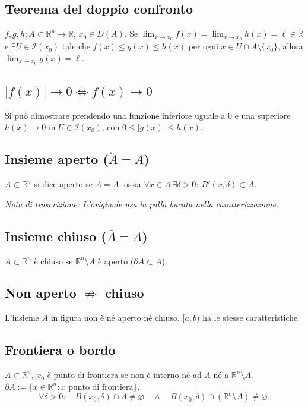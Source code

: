 \documentclass[11pt,a4paper]{article}
\newcommand{\R}{\mathbb R}\newcommand{\N}{\mathbb N}\newcommand{\pagina}[1]{\clearpage}
\newcommand{\nota}[1]{\par\textit{Nota di trascrizione: #1}\par}
\begin{document}
\subsection*{Teorema del doppio confronto}
$f,g,h:A\subset\R^n\to\R$, $x_0\in D(A)$. Se $\lim_{x\to x_0}f(x)=\lim_{x\to x_0}h(x)=\ell\in\R$ e $\exists U\in\mathcal I(x_0)$ tale che $f(x)\le g(x)\le h(x)$ per ogni $x\in U\cap A\setminus\{x_0\}$, allora $\lim_{x\to x_0}g(x)=\ell$.
\subsection*{$|f(x)|\to0\iff f(x)\to0$}
Si può dimostrare prendendo una funzione inferiore uguale a $0$ e una superiore $h(x)\to0$ in $U\in\mathcal I(x_0)$, con $0\le|g(x)|\le h(x)$.
\subsection*{Insieme aperto ($\mathring A=A$)}
$A\subset\R^n$ si dice aperto se $\mathring A=A$, ossia $\forall x\in A\ \exists\delta>0:\ B'(x,\delta)\subset A$.
\nota{L'originale usa la palla bucata nella caratterizzazione.}
\subsection*{Insieme chiuso ($\overline A=A$)}
$A\subset\R^n$ è chiuso se $\R^n\setminus A$ è aperto ($\partial A\subset A$).
\pagina{15}
\subsection*{Non aperto $\not\Rightarrow$ chiuso}
L'insieme $A$ in figura non è né aperto né chiuso. $[a,b)$ ha le stesse caratteristiche.
\begin{center}\end{center}
\subsection*{Frontiera o bordo}
$A\subset\R^n$, $x_0$ è punto di frontiera se non è interno né ad $A$ né a $\R^n\setminus A$.
$\partial A:=\{x\in\R^n:x\text{ punto di frontiera}\}$.
\[\forall\delta>0:\quad B(x_0,\delta)\cap A\ne\varnothing\quad\wedge\quad B(x_0,\delta)\cap(\R^n\setminus A)\ne\varnothing.\]
\end{document}
